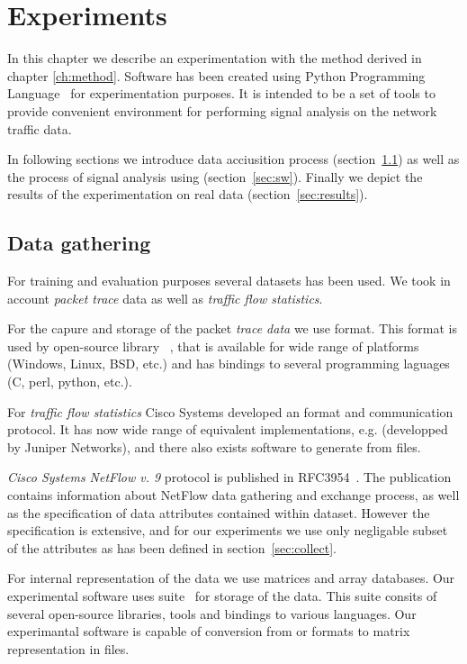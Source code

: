 \chapter{Experiments}\label{ch:experiments}

In this chapter we describe an experimentation with the method derived in chapter
\ref{ch:method}. Software  has been created using 
Python Programming Language~\cite{rossum2011python} for
experimentation purposes. It is intended
to be a set of tools to provide convenient environment 
for performing signal analysis on the network traffic data. 

In following sections we introduce data acciusition process (section~\ref{sec:data})
as well as the process of signal analysis using  (section~\ref{sec:sw}).
Finally we depict the results of the experimentation on real data (section~\ref{sec:results}).

\section{Data gathering} \label{sec:data}

For training and evaluation purposes several datasets has been used. We took in account
\emph{packet trace} data as well as \emph{traffic flow statistics}. 

For the capure and storage of the packet \emph{trace data} we use  format.
This format is used by open-source library ~\cite{jacobson2009libpcap}, 
that is available for wide range of platforms (Windows, Linux, BSD, etc.) and 
has bindings to several programming laguages (C, perl, python, etc.).

For \emph{traffic flow statistics}  Cisco Systems developed an 
 format and communication protocol.
It has now wide range of equivalent implementations, e.g.  
(developped by Juniper Networks), and there also exists software to generate 
 from  files.

\emph{Cisco Systems NetFlow v. 9}  protocol is published in RFC3954~\cite{claise2007rfc}.
The publication contains information about NetFlow data gathering and exchange process, as well
as the specification of data attributes contained within dataset.
However the specification is extensive, and for our experiments we use only negligable 
subset of the attributes as has been defined in section~\ref{sec:collect}.

For internal representation of the data we use matrices and array databases.
Our experimental software uses  suite~\cite{folk2011overview}
for storage of the data. This suite consits of several open-source libraries, tools and 
bindings to various languages.
Our experimantal software is capable of conversion from  or  
formats to matrix representation in  files.

